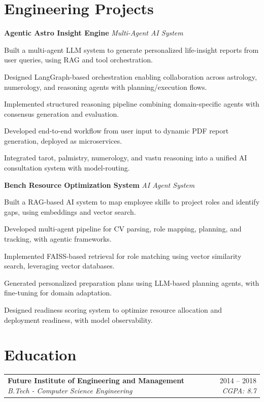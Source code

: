 \documentclass[10pt, letterpaper]{article}
\makeatletter
\newcommand{\resumeitem}[1]{\item\small{#1}}
\newcommand{\jobheading}[4]{%
  \noindent
  \begin{tabularx}{\textwidth}{@{}X r@{}}
    \textbf{\color{primary}#1} \textbar{} \textit{\small\color{subtle}#2} &
    \small\color{subtle}#3 \textbar{} \textit{\small #4}
  \end{tabularx}%
}
\makeatother
\begin{document}
\section{Engineering Projects}

\noindent\textbf{Agentic Astro Insight Engine} \textemdash{} \textit{Multi-Agent AI System}

\begin{projectitems}
\resumeitem{Built a multi-agent LLM system to generate personalized life-insight reports from user queries, using RAG and tool orchestration.}
\resumeitem{Designed LangGraph-based orchestration enabling collaboration across astrology, numerology, and reasoning agents with planning/execution flows.}
\resumeitem{Implemented structured reasoning pipeline combining domain-specific agents with consensus generation and evaluation.}
\resumeitem{Developed end-to-end workflow from user input to dynamic PDF report generation, deployed as microservices.}
\resumeitem{Integrated tarot, palmistry, numerology, and vastu reasoning into a unified AI consultation system with model-routing.}
\end{projectitems}

\noindent\textbf{Bench Resource Optimization System} \textemdash{} \textit{AI Agent System}

\begin{projectitems}
\resumeitem{Built a RAG-based AI system to map employee skills to project roles and identify gaps, using embeddings and vector search.}
\resumeitem{Developed multi-agent pipeline for CV parsing, role mapping, planning, and tracking, with agentic frameworks.}
\resumeitem{Implemented FAISS-based retrieval for role matching using vector similarity search, leveraging vector databases.}
\resumeitem{Generated personalized preparation plans using LLM-based planning agents, with fine-tuning for domain adaptation.}
\resumeitem{Designed readiness scoring system to optimize resource allocation and deployment readiness, with model observability.}
\end{projectitems}

\section{Education}

\jobheading{Future Institute of Engineering and Management}{B.Tech - Computer Science Engineering}{2014 -- 2018}{CGPA: 8.7}
\end{document}
